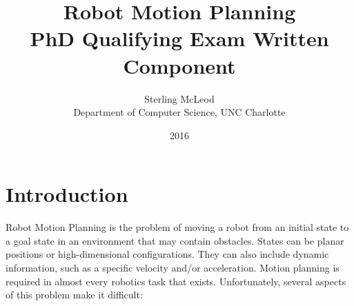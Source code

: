 \documentclass[10pt,conference]{ieeeconf}
\begin{document}





\author{Sterling McLeod\\Department of Computer Science, UNC Charlotte}
\title {Robot Motion Planning\\PhD Qualifying Exam Written Component}
\date {2016}

\maketitle

\renewcommand{\algorithmicforall}{\textbf{for each}}

\section{Introduction}

	Robot Motion Planning is the problem of moving a robot from an initial state to a goal state in an environment that may contain obstacles. States can be planar positions or high-dimensional configurations. They can also include dynamic information, such as a specific velocity and/or acceleration.	Motion planning is required in almost every robotics task that exists. Unfortunately, several aspects of this problem make it difficult: 
	
\end{document}
